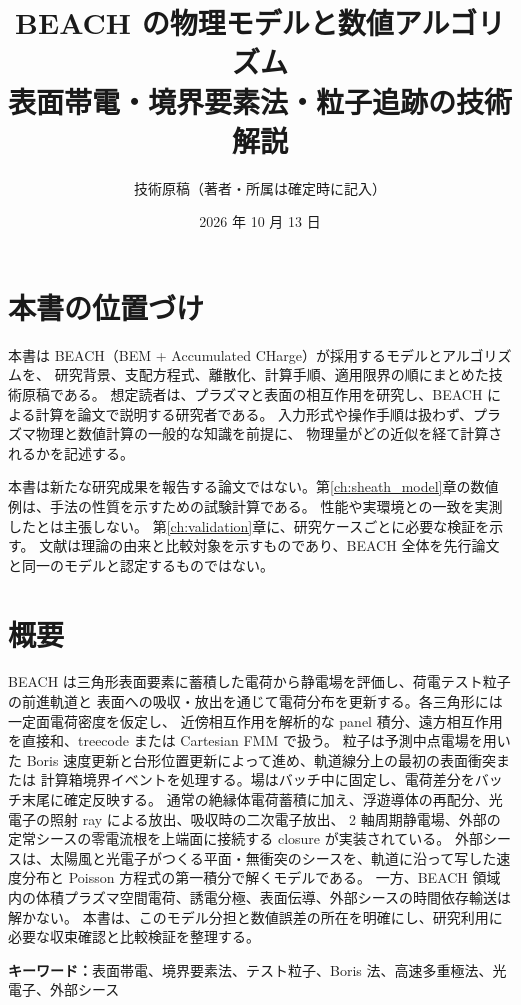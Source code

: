 \documentclass[11pt,a4paper,oneside,openany]{book}
\title{BEACH の物理モデルと数値アルゴリズム\\[0.6em]
  \Large 表面帯電・境界要素法・粒子追跡の技術解説}
\author{技術原稿（著者・所属は確定時に記入）}
\date{2026 年 10 月 13 日}
\begin{document}
\pagestyle{plain}
\frontmatter
\maketitle
\chapter*{本書の位置づけ}
本書は BEACH（BEM + Accumulated CHarge）が採用するモデルとアルゴリズムを、
研究背景、支配方程式、離散化、計算手順、適用限界の順にまとめた技術原稿である。
想定読者は、プラズマと表面の相互作用を研究し、BEACH による計算を論文で説明する研究者である。
入力形式や操作手順は扱わず、プラズマ物理と数値計算の一般的な知識を前提に、
物理量がどの近似を経て計算されるかを記述する。

本書は新たな研究成果を報告する論文ではない。第\ref{ch:sheath_model}章の数値例は、手法の性質を示すための試験計算である。
性能や実環境との一致を実測したとは主張しない。
第\ref{ch:validation}章に、研究ケースごとに必要な検証を示す。
文献は理論の由来と比較対象を示すものであり、BEACH 全体を先行論文と同一のモデルと認定するものではない。

\chapter*{概要}
BEACH は三角形表面要素に蓄積した電荷から静電場を評価し、荷電テスト粒子の前進軌道と
表面への吸収・放出を通じて電荷分布を更新する。各三角形には一定面電荷密度を仮定し、
近傍相互作用を解析的な panel 積分、遠方相互作用を直接和、treecode または Cartesian FMM で扱う。
粒子は予測中点電場を用いた Boris 速度更新と台形位置更新によって進め、軌道線分上の最初の表面衝突または
計算箱境界イベントを処理する。場はバッチ中に固定し、電荷差分をバッチ末尾に確定反映する。
通常の絶縁体電荷蓄積に加え、浮遊導体の再配分、光電子の照射 ray による放出、吸収時の二次電子放出、
2 軸周期静電場、外部の定常シースの零電流根を上端面に接続する closure が実装されている。
外部シースは、太陽風と光電子がつくる平面・無衝突のシースを、軌道に沿って写した速度分布と Poisson 方程式の第一積分で解くモデルである。
一方、BEACH 領域内の体積プラズマ空間電荷、誘電分極、表面伝導、外部シースの時間依存輸送は解かない。
本書は、このモデル分担と数値誤差の所在を明確にし、研究利用に必要な収束確認と比較検証を整理する。

\noindent\textbf{キーワード：}表面帯電、境界要素法、テスト粒子、Boris 法、高速多重極法、光電子、外部シース
\end{document}
